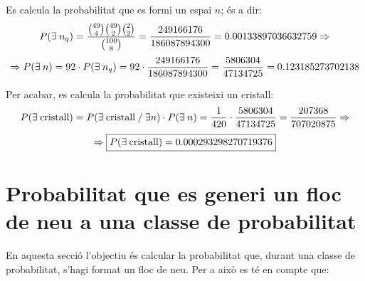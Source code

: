 \documentclass[12pt]{report}
\begin{document}
Es calcula la probabilitat que es formi un espai $n$; és a dir:
$$P(\exists \hspace{0.25em} n_q)=\frac{\binom{49}{4}\binom{49}{2}\binom{2}{2}}{\binom{100}{8}}=\frac{249166176}{186087894300}=0.00133897036632759 \Rightarrow$$
$$\Rightarrow P(\exists \hspace{0.25em} n)=92\cdot P(\exists \hspace{0.25em} n_q) = 92\cdot \frac{249166176}{186087894300} = \frac{5806304}{47134725}= 0.123185273702138$$

\hspace{-1.5em}Per acabar, es calcula la probabilitat que existeixi un cristall:
\begin{equation*}
    P(\exists \hspace{0.25em} \text{cristall})=P(\exists \hspace{0.25em}\text{cristall} \hspace{0.25em}/ \hspace{0.25em}\exists n)\cdot P(\exists \hspace{0.25em} n)=\frac{1}{420}\cdot \frac{5806304}{47134725} = \frac{207368}{707020875} \Rightarrow
\end{equation*}
\begin{equation}
    \Rightarrow\fcolorbox{black}{white}{$ P(\exists \hspace{0.25em}\text{cristall})=0.000293298270719376$} 
    \label{probabilitat cristall}
\end{equation}




\newpage
\section{Probabilitat que es generi un floc de neu a una classe de probabilitat}
En aquesta secció l'objectiu és calcular la probabilitat que, durant una classe de probabilitat, s'hagi format un floc de neu. Per a això es té en compte que:
\end{document}
